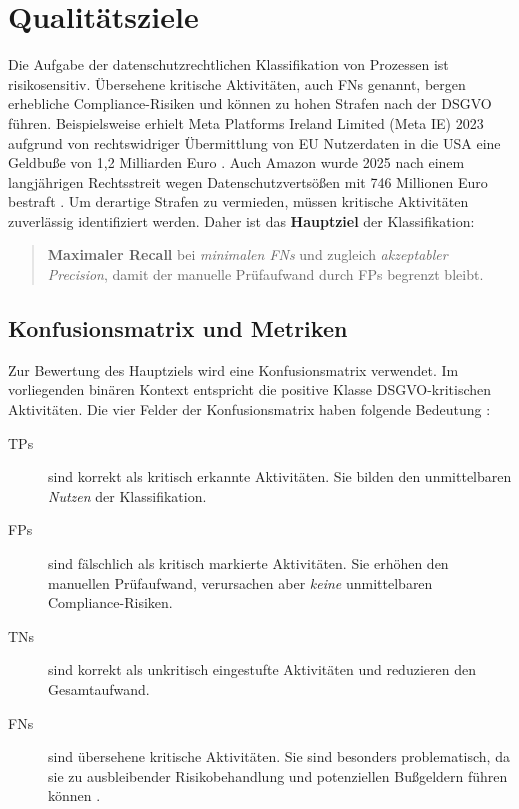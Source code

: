 \section{Qualitätsziele}\label{sec:qualitatsziele}

Die Aufgabe der datenschutzrechtlichen Klassifikation von Prozessen ist risikosensitiv. Übersehene kritische Aktivitäten, auch \acp{FN} genannt, bergen erhebliche Compliance-Risiken und können zu hohen Strafen nach der \ac{DSGVO} führen. Beispielsweise erhielt Meta Platforms Ireland Limited (Meta IE) 2023 aufgrund von rechtswidriger Übermittlung von \ac{EU} Nutzerdaten in die USA eine Geldbuße von 1,2 Milliarden Euro \cite{edpb-meta-fine}. Auch Amazon wurde 2025 nach einem langjährigen Rechtsstreit wegen Datenschutzvertsößen mit 746 Millionen Euro bestraft \cite{datenschutzticker-amazon-fine, reuters-amazon-fine}. Um derartige Strafen zu vermieden, müssen kritische Aktivitäten zuverlässig identifiziert werden. Daher ist das \textbf{Hauptziel} der Klassifikation:

\begin{quote}
    \textbf{Maximaler Recall} bei \emph{minimalen \acp{FN}} und zugleich \emph{akzeptabler Precision}, damit der manuelle Prüfaufwand durch \acp{FP} begrenzt bleibt.
\end{quote}

\subsection*{Konfusionsmatrix und Metriken}

Zur Bewertung des Hauptziels wird eine Konfusionsmatrix verwendet. Im vorliegenden binären Kontext entspricht die positive Klasse \ac{DSGVO}-kritischen Aktivitäten. Die vier Felder der Konfusionsmatrix haben folgende Bedeutung \cite{sokolova2009measureclassification}:

\begin{description}
    \item [\acp{TP}] sind korrekt als kritisch erkannte Aktivitäten. Sie bilden den unmittelbaren \emph{Nutzen} der Klassifikation.
    \item [\acp{FP}] sind fälschlich als kritisch markierte Aktivitäten. Sie erhöhen den manuellen Prüfaufwand, verursachen aber \emph{keine} unmittelbaren Compliance-Risiken.
    \item[\acp{TN}] sind korrekt als unkritisch eingestufte Aktivitäten und reduzieren den Gesamtaufwand.
    \item[\acp{FN}] sind übersehene kritische Aktivitäten. Sie sind besonders problematisch, da sie zu ausbleibender Risikobehandlung und potenziellen Bußgeldern führen können \cite{nake2023towards}.
\end{description}


